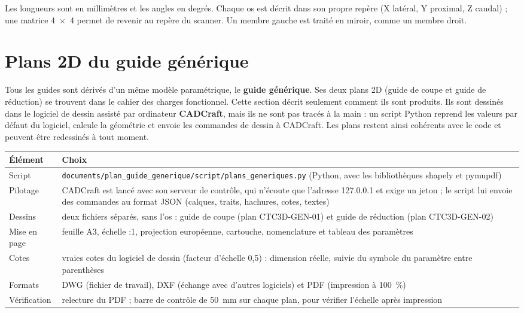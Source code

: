 \documentclass[11pt,a4paper]{article}
\newcommand{\fichier}[1]{\texttt{\small #1}}
\DeclareRobustCommand{\echelle}{{\NoAutoSpacing 2:1}}
\begin{document}
\medskip
Les longueurs sont en millimètres et les angles en degrés. Chaque os est décrit dans son propre repère (X latéral,
Y proximal, Z caudal) ; une matrice 4~$\times$~4 permet de revenir au repère du scanner. Un membre gauche est traité en
miroir, comme un membre droit.

\section{Plans 2D du guide générique}
\label{sec:plans}

Tous les guides sont dérivés d'un même modèle paramétrique, le \textbf{guide générique}. Ses deux plans 2D (guide
de coupe et guide de réduction) se trouvent dans le cahier des charges fonctionnel. Cette section décrit seulement
comment ils sont produits. Ils sont dessinés dans le logiciel de dessin assisté par ordinateur \textbf{CADCraft}, mais
ils ne sont pas tracés à la main : un script Python reprend les valeurs par défaut du logiciel, calcule la géométrie
et envoie les commandes de dessin à CADCraft. Les plans restent ainsi cohérents avec le code et peuvent être
redessinés à tout moment.

\begin{tabularx}{\textwidth}{@{}lX@{}}
\toprule
\textbf{Élément} & \textbf{Choix} \\ \midrule
Script & \fichier{documents/plan\_guide\_generique/script/plans\_generiques.py} (Python, avec les bibliothèques
  shapely et pymupdf) \\
Pilotage & CADCraft est lancé avec son serveur de contrôle, qui n'écoute que l'adresse 127.0.0.1 et exige un jeton ;
  le script lui envoie des commandes au format JSON (calques, traits, hachures, cotes, textes) \\
Dessins & deux fichiers séparés, sans l'os : guide de coupe (plan CTC3D-GEN-01) et guide de réduction (plan
  CTC3D-GEN-02) \\
Mise en page & feuille A3, échelle \echelle{}, projection européenne, cartouche, nomenclature et tableau des
  paramètres \\
Cotes & vraies cotes du logiciel de dessin (facteur d'échelle 0,5) : dimension réelle, suivie du symbole du
  paramètre entre parenthèses \\
Formats & DWG (fichier de travail), DXF (échange avec d'autres logiciels) et PDF (impression à 100~\%) \\
Vérification & relecture du PDF ; barre de contrôle de 50~mm sur chaque plan, pour vérifier l'échelle après
  impression \\
\bottomrule
\end{tabularx}
\end{document}

